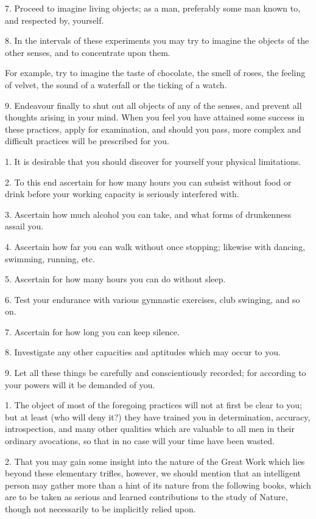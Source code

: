 7. Proceed to imagine living objects; as a man, preferably some man known to, and respected by, yourself.

8. In the intervals of these experiments you may try to imagine the objects of the other senses, and to concentrate upon them.

For example, try to imagine the taste of chocolate, the smell of roses, the feeling of velvet, the sound of a waterfall or the ticking of a watch.

9. Endeavour finally to shut out all objects of any of the senses, and prevent all thoughts arising in your mind. When you feel you have attained some success in these practices, apply for examination, and should you pass, more complex and difficult practices will be prescribed for you.


1. It is desirable that you should discover for yourself your physical limitations.

2. To this end ascertain for how many hours you can subsist without food or drink before your working capacity is seriously interfered with.

3. Ascertain how much alcohol you can take, and what forms of drunkenness assail you.

4. Ascertain how far you can walk without once stopping; likewise with dancing, swimming, running, etc.

5. Ascertain for how many hours you can do without sleep.

6. Test your endurance with various gymnastic exercises, club swinging, and so on.

7. Ascertain for how long you can keep silence.

8. Investigate any other capacities and aptitudes which may occur to you.

9. Let all these things be carefully and conscientiously recorded; for according to your powers will it be demanded of you.


1. The object of most of the foregoing practices will not at first be clear to you; but at least (who will deny it?) they have trained you in determination, accuracy, introspection, and many other qualities which are valuable to all men in their ordinary avocations, so that in no case will your time have been wasted.

2. That you may gain some insight into the nature of the Great Work which lies beyond these elementary trifles, however, we should mention that an intelligent person may gather more than a hint of its nature from the following books, which are to be taken as serious and learned contributions to the study of Nature, though not necessarily to be implicitly relied upon.

